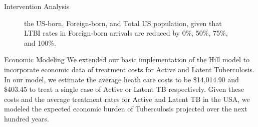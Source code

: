 \documentclass[final]{beamer}
\begin{document}
\begin{frame}
\begin{columns}
\begin{column}{.3\textwidth}
\begin{block}{Intervention Analysis}
\begin{figure}[h]
{                       the US-born, Foreign-born, and Total US population, given
                       that LTBI rates in Foreign-born arrivals are reduced by 
                       0\%, 50\%, 75\%, and 100\%.}
          \label{fig:redEnLTBI_costs}
        \end{figure}
      \end{block}
      \begin{block}{Economic Modeling}
        We extended our basic implementation of the Hill model to incorporate
        economic data of treatment costs for Active and Latent Tuberculosis.  
        In our model, we estimate the average heath care costs to be \$14,014.90
        and \$403.45 to treat a single case of Active or Latent TB respectively.  
        Given these costs and the average treatment rates for Active and Latent
        TB in the USA, we modeled the expected economic burden of Tuberculosis
        projected over the next hundred years.  


\end{block}
\end{column}
\end{columns}
\end{frame}
\end{document}
